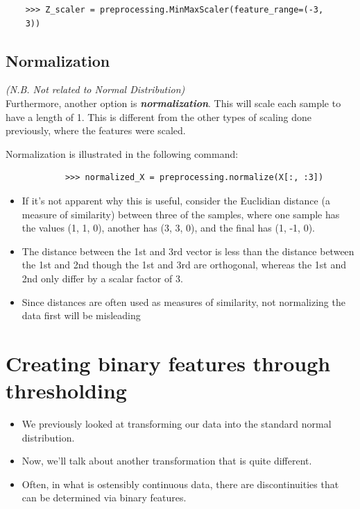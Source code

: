 \documentclass[SKL-MASTER.tex]{subfiles}
\begin{document}
		\begin{verbatim}
	>>> Z_scaler = preprocessing.MinMaxScaler(feature_range=(-3,
	3))
	\end{verbatim}

\newpage
\subsection*{Normalization}
\textit{(N.B. Not related to Normal Distribution)}\\
	Furthermore, another option is \textbf{\textit{normalization}}. This will scale each sample to have a length of
	1. This is different from the other types of scaling done previously, where the features were
	scaled. 
	
Normalization is illustrated in the following command:
	\begin{framed}
		\begin{verbatim}
			>>> normalized_X = preprocessing.normalize(X[:, :3])
	\end{verbatim}
\end{framed}
\begin{itemize}
\item If it's not apparent why this is useful, consider the Euclidian distance (a measure of similarity)
	between three of the samples, where one sample has the values (1, 1, 0), another has (3, 3,
	0), and the final has (1, -1, 0).
\item	The distance between the 1st and 3rd vector is less than the distance between the 1st and 2nd
	though the 1st and 3rd are orthogonal, whereas the 1st and 2nd only differ by a scalar factor of
	3. 
\item Since distances are often used as measures of similarity, not normalizing the data first will
	be misleading
\end{itemize}


\section*{Creating binary features through thresholding}
\begin{itemize}
\item We  previously looked at transforming our data into the standard normal distribution.
\item Now, we'll talk about another transformation that is quite different.
\item Often, in what is ostensibly
continuous data, there are discontinuities that can be determined via binary features.
\end{itemize}
\end{document}
